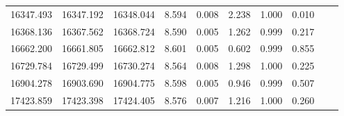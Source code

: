 \begin{table}
\begin{center}
\begin{tabular}{cccccccccc}
16347.493 & 16347.192 & 16348.044 & 8.594 & 0.008 & 2.238 & 1.000 & 0.010 \\
16368.136 & 16367.562 & 16368.724 & 8.590 & 0.005 & 1.262 & 0.999 & 0.217 \\
16662.200 & 16661.805 & 16662.812 & 8.601 & 0.005 & 0.602 & 0.999 & 0.855 \\
16729.784 & 16729.499 & 16730.274 & 8.564 & 0.008 & 1.298 & 1.000 & 0.225 \\
16904.278 & 16903.690 & 16904.775 & 8.598 & 0.005 & 0.946 & 0.999 & 0.507 \\
17423.859 & 17423.398 & 17424.405 & 8.576 & 0.007 & 1.216 & 1.000 & 0.260 \\
\bottomrule
\end{tabular}
\end{center}
\end{table}

